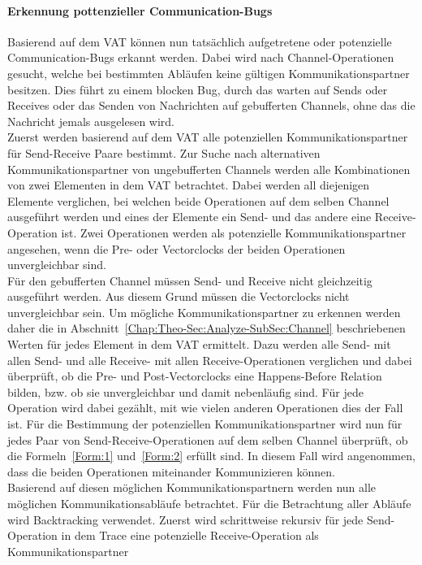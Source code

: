 \paragraph{Erkennung pottenzieller Communication-Bugs}
Basierend auf dem VAT können nun tatsächlich aufgetretene oder potenzielle 
Communication-Bugs erkannt werden. Dabei wird nach Channel-Operationen 
gesucht, welche bei bestimmten Abläufen keine gültigen Kommunikationspartner
besitzen. Dies führt zu einem blocken Bug, durch das warten auf 
Sends oder Receives oder das Senden von Nachrichten auf gebufferten 
Channels, ohne das die Nachricht jemals ausgelesen wird.\\  
Zuerst werden basierend auf dem VAT alle potenziellen Kommunikationspartner 
für Send-Receive Paare bestimmt.
Zur Suche nach alternativen Kommunikationspartner von ungebufferten Channels
werden alle Kombinationen
von zwei Elementen in dem VAT betrachtet. Dabei werden all diejenigen 
Elemente verglichen, bei welchen beide Operationen auf dem selben Channel 
ausgeführt werden und eines der 
Elemente ein Send- und das andere eine Receive-Operation ist. Zwei Operationen
werden als potenzielle Kommunikationspartner angesehen, wenn die Pre- oder
Vectorclocks der beiden 
Operationen unvergleichbar sind.\\
Für den gebufferten Channel müssen Send- und Receive nicht 
gleichzeitig ausgeführt werden. Aus diesem Grund müssen die Vectorclocks 
nicht unvergleichbar sein. Um mögliche Kommunikationspartner zu erkennen 
werden daher 
die in Abschnitt~\ref{Chap:Theo-Sec:Analyze-SubSec:Channel} beschriebenen 
Werten für jedes Element in dem VAT ermittelt. Dazu werden alle Send- mit allen 
Send- und alle Receive- mit allen Receive-Operationen verglichen 
und dabei überprüft, ob die Pre- und Post-Vectorclocks eine Happens-Before 
Relation bilden, bzw. ob sie unvergleichbar und damit nebenläufig sind. 
Für jede Operation wird dabei gezählt, mit wie vielen anderen Operationen 
dies der Fall ist.
Für die Bestimmung der potenziellen Kommunikationspartner wird nun 
für jedes Paar von Send-Receive-Operationen auf dem selben Channel 
überprüft, 
ob die Formeln~\eqref{Form:1} und~\eqref{Form:2} 
erfüllt sind. In diesem Fall wird angenommen, dass die beiden Operationen
miteinander Kommunizieren können.\\
Basierend auf diesen möglichen Kommunikationspartnern werden nun alle möglichen
Kommunikationsabläufe betrachtet. Für die Betrachtung aller Abläufe 
wird Backtracking verwendet. Zuerst wird schrittweise rekursiv für jede Send-Operation 
in dem Trace eine potenzielle Receive-Operation als Kommunikationspartner 
